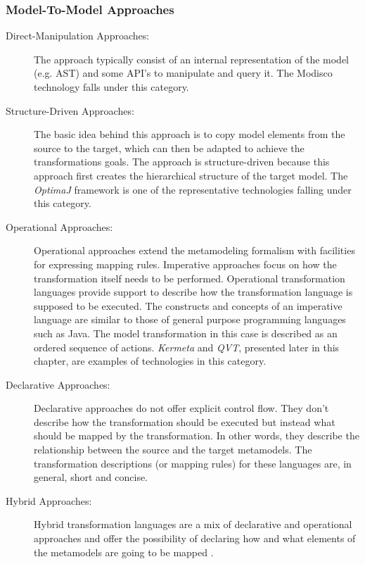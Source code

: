 \subsubsection{Model-To-Model Approaches}
\begin{description}

\item[Direct-Manipulation Approaches:] The approach typically consist of an internal representation of the model (e.g. AST) and some API's to manipulate and query it. The Modisco \cite{ModiscoMain} technology falls under this category.

\item[Structure-Driven Approaches:]
The basic idea behind this approach is to copy model elements from the source to the target, which can  then be adapted to achieve the transformations goals. The approach is structure-driven because this approach first creates the hierarchical structure of the target model. The \textit{OptimaJ} framework is one of the representative technologies falling under this category.

\item[Operational Approaches:]
Operational approaches extend the metamodeling formalism with facilities for expressing mapping rules. 
Imperative approaches focus on how the transformation itself needs to be performed. Operational transformation languages provide support to describe how the transformation language is supposed to be executed. The constructs and concepts of an imperative language are similar to those of general purpose programming languages such as Java. The model transformation in this case is described as an ordered sequence of actions. \textit{Kermeta} and \textit{QVT}, presented later in this chapter, are examples of technologies in this category.

\item[Declarative Approaches:]
Declarative approaches do not offer explicit control flow. They don't describe how the transformation should be executed but instead what should be mapped by the transformation. In other words, they describe the relationship between the source and the target metamodels. The transformation descriptions (or mapping rules) for these languages are, in general, short and concise. 

\item[Hybrid Approaches:]
Hybrid transformation languages are a mix of declarative and operational approaches and offer the possibility of declaring how and what elements of the metamodels are going to be mapped \cite{HybridModelTransform}.


\end{description}

